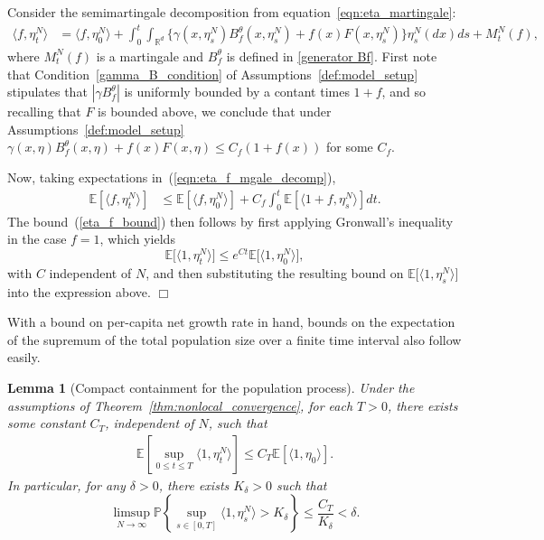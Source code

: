 \documentclass[12pt]{article}
\newenvironment {proof}{{\noindent\bf Proof }}{\hfill $\Box$ \medskip}
\newtheorem{lemma}[theorem]{Lemma}
\newcommand{\IP}{\mathbb P}
\newcommand{\IE}{\mathbb E}
\newcommand{\IR}{\mathbb R}
\numberwithin{equation}{section}
\begin{document}
\begin{proof}
Consider the semimartingale decomposition from equation~\eqref{eqn:eta_martingale}:
\begin{align} \label{eqn:eta_f_mgale_decomp}
    \langle f, \eta^N_t \rangle
    &=
    \langle f, \eta^N_0 \rangle
    + \int_0^t \int_{\IR^d} \big\{
        \gamma(x, \eta^N_s) B^\theta_f(x, \eta^N_s)
        + f(x) F(x, \eta^N_s)
        \big\} \eta^N_s(dx) ds
    + M^N_t(f) ,
\end{align}
where $M^N_t(f)$ is a martingale and $B^\theta_f$ is defined in \eqref{generator Bf}.
First note that Condition~\ref{gamma_B_condition} of Assumptions~\ref{def:model_setup}
stipulates that $|\gamma B^\theta_f|$ is uniformly bounded by a contant times $1 + f$,
and so recalling that $F$ is bounded above, we conclude that
under Assumptions~\ref{def:model_setup}
$\gamma(x, \eta) B^\theta_f(x, \eta) + f(x) F(x, \eta) \le C_f (1 + f(x))$ for some $C_f$.

Now, taking expectations in~(\ref{eqn:eta_f_mgale_decomp}),
    \begin{align}
\label{bound on intfdeta}
        \IE\left[ \langle f, \eta^N_t \rangle \right]
        &\le
        \IE\left[ \langle f, \eta^N_0 \rangle \right]
        + C_f \int_0^t \IE\left[ \langle 1 + f, \eta^N_s \rangle \right] dt .
    \end{align}
The bound~(\ref{eta_f_bound}) then follows by first applying Gronwall's
inequality in the case $f=1$, which yields
\[
	\IE\big[\langle 1,\eta_t^N\rangle\big]\leq e^{Ct}\IE\big[\langle 1,\eta_0^N\rangle\big],
\]
with $C$ independent of $N$, and then substituting 
the resulting bound on $\IE\big[\langle 1,\eta_s^N\rangle\big]$ into the
expression above.
\end{proof}

With a bound on per-capita net growth rate in hand,
bounds on the expectation of the supremum of 
the total population size over a finite time interval also follow easily.

\begin{lemma}[Compact containment for the population process]
    \label{lem:eta_compact_containment}
    Under the assumptions of Theorem~\ref{thm:nonlocal_convergence},
    for each $T>0$, there exists some constant $C_T$,
independent of $N$,
    such that
    \begin{align}
        \label{eqn:eta_mass_bound}
        \IE\left[
            \sup_{0 \le t \le T}
            \langle 1, \eta^{N}_t \rangle
        \right]
        \le C_T \IE[\langle 1,\eta_0\rangle].
    \end{align}
    In particular, for any $\delta > 0$, there exists $K_{\delta}>0$ such that
    \begin{equation}
    \limsup_{N \to \infty}
        \IP \left\{ \sup_{s \in [0,T]}
            \langle 1 ,\eta^{N}_{s}\rangle
            > K_\delta \right\}
        \leq \frac{C_T}{K_{\delta}}
        < \delta.
    \end{equation}
\end{lemma}
\end{document}

